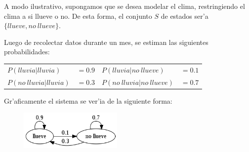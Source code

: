 A modo ilustrativo, supongamos que se desea modelar el clima, restringiendo el clima a si llueve o no. De esta forma, el conjunto $S$ de estados
ser'a $\{llueve, no\ llueve\}$. 

Luego de recolectar datos durante un mes, se estiman las siguientes probabilidades:

\begin{center}
\begin{tabular}{l l l l}
$P(lluvia | lluvia) $ & $=0.9$ & $P(lluvia | no\ llueve) $& $=0.1$\\
$P(no\ lluvia | lluvia)  $ & $=0.3$ & $P(no\ lluvia | no\ llueve) $ & $=0.7$\\
\end{tabular}
\end{center}

Gr'aficamente el sistema se ver'ia de la siguiente forma:

\begin{figure}[h]
\begin{center}
\includegraphics[width=5cm]{images/weather_graph.png}
\end{center}
\end{figure}


